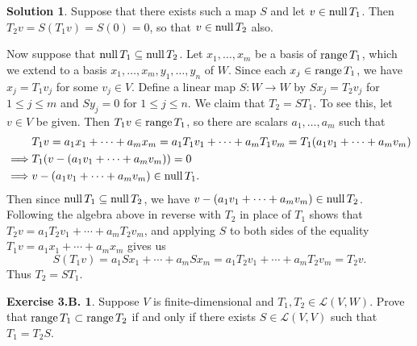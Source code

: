 \documentclass[12pt]{article}
\theoremstyle{definition}
\theoremstyle{exercise}
\newtheorem{exercise}{Exercise 3.B.}
\theoremstyle{solution}
\newtheorem*{solution}{Solution}
\newcommand{\lmap}{\mathcal{L}}
\newcommand{\Null}{\text{null\,}}
\newcommand{\Range}{\text{range\,}}
\begin{document}
\begin{solution}
    Suppose that there exists such a map \( S \) and let \( v \in \Null T_1 \). Then \( T_2 v = S(T_1 v) = S(0) = 0 \), so that \( v \in \Null T_2 \) also.

    Now suppose that \( \Null T_1 \subseteq \Null T_2 \). Let \( x_1, \ldots, x_m \) be a basis of \( \Range T_1 \), which we extend to a basis \( x_1, \ldots, x_m, y_1, \ldots, y_n \) of \( W \). Since each \( x_j \in \Range T_1 \), we have \( x_j = T_1 v_j \) for some \( v_j \in V \). Define a linear map \( S : W \to W \) by \( S x_j = T_2 v_j \) for \( 1 \leq j \leq m \) and \( S y_j = 0 \) for \( 1 \leq j \leq n \). We claim that \( T_2 = ST_1 \). To see this, let \( v \in V \) be given. Then \( T_1 v \in \Range T_1 \), so there are scalars \( a_1, \ldots, a_m \) such that
    \begin{align*}
        & T_1 v = a_1 x_1 + \cdots + a_m x_m = a_1 T_1 v_1 + \cdots + a_m T_1 v_m = T_1 (a_1 v_1 + \cdots + a_m v_m) \\
        \implies & T_1 (v - (a_1 v_1 + \cdots + a_m v_m)) = 0 \\
        \implies & v - (a_1 v_1 + \cdots + a_m v_m) \in \Null T_1.
    \end{align*}
    Then since \( \Null T_1 \subseteq \Null T_2 \), we have \( v - (a_1 v_1 + \cdots + a_m v_m) \in \Null T_2 \). Following the algebra above in reverse with \( T_2 \) in place of \( T_1 \) shows that \( T_2 v = a_1 T_2 v_1 + \cdots + a_m T_2 v_m \), and applying \( S \) to both sides of the equality \( T_1 v = a_1 x_1 + \cdots + a_m x_m \) gives us
    \[
        S(T_1 v) = a_1 Sx_1 + \cdots + a_m Sx_m = a_1 T_2 v_1 + \cdots + a_m T_2 v_m = T_2 v.
    \]
    Thus \( T_2 = ST_1 \).
\end{solution}

\begin{exercise}
\label{ex:25}
    Suppose \( V \) is finite-dimensional and \( T_1, T_2 \in \lmap(V, W) \). Prove that \( \Range T_1 \subset \Range T_2 \) if and only if there exists \( S \in \lmap(V, V) \) such that \( T_1 = T_2 S \).
\end{exercise}
\end{document}
